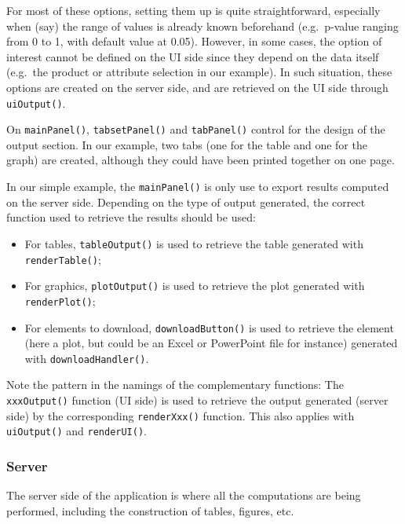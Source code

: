 \documentclass[
]{krantz}
\providecommand{\tightlist}{%
  \setlength{\itemsep}{0pt}\setlength{\parskip}{0pt}}
\renewenvironment{quote}{\begin{VF}}{\end{VF}}
\begin{document}
For most of these options, setting them up is quite straightforward, especially when (say) the range of values is already known beforehand (e.g.~p-value ranging from 0 to 1, with default value at 0.05). However, in some cases, the option of interest cannot be defined on the UI side since they depend on the data itself (e.g.~the product or attribute selection in our example). In such situation, these options are created on the server side, and are retrieved on the UI side through \texttt{uiOutput()}.

On \texttt{mainPanel()}, \texttt{tabsetPanel()} and \texttt{tabPanel()} control for the design of the output section. In our example, two tabs (one for the table and one for the graph) are created, although they could have been printed together on one page.

In our simple example, the \texttt{mainPanel()} is only use to export results computed on the server side. Depending on the type of output generated, the correct function used to retrieve the results should be used:

\begin{itemize}
\tightlist
\item
  For tables, \texttt{tableOutput()} is used to retrieve the table generated with \texttt{renderTable()};
\item
  For graphics, \texttt{plotOutput()} is used to retrieve the plot generated with \texttt{renderPlot()};
\item
  For elements to download, \texttt{downloadButton()} is used to retrieve the element (here a plot, but could be an Excel or PowerPoint file for instance) generated with \texttt{downloadHandler()}.
\end{itemize}

\begin{quote}
Note the pattern in the namings of the complementary functions: The \texttt{xxxOutput()} function (UI side) is used to retrieve the output generated (server side) by the corresponding \texttt{renderXxx()} function. This also applies with \texttt{uiOutput()} and \texttt{renderUI()}.
\end{quote}

\hypertarget{server}{%
\subsubsection*{Server}\label{server}}


The server side of the application is where all the computations are being performed, including the construction of tables, figures, etc.
\end{document}
